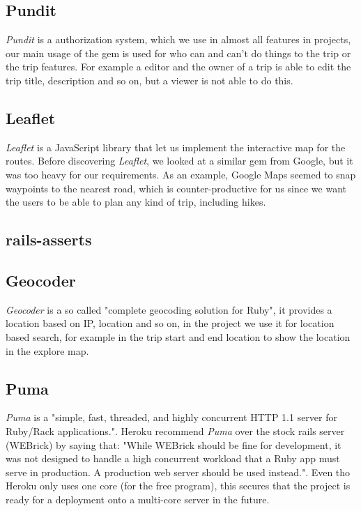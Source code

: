 \documentclass[a4paper]{article}
\begin{document}
\subsection{Pundit}
\textit{Pundit} is a authorization system\cite{pundit}, which we use in almost all features in projects, our main usage of the gem is used for who can and can't do things to the trip or the trip features. For example a editor and the owner of a trip is able to edit the trip title, description and so on, but a viewer is not able to do this. 

\subsection{Leaflet}
\textit{Leaflet}\cite{leaflet} is a JavaScript library that let us implement the interactive map for the routes. Before discovering \textit{Leaflet}, we looked at a similar gem from Google, but it was too heavy for our requirements. As an example, Google Maps seemed to snap waypoints to the nearest road, which is counter-productive for us since we want the users to be able to plan any kind of trip, including hikes.

\subsection{rails-asserts}

\subsection{Geocoder}
\textit{Geocoder} is a so called "complete geocoding solution for Ruby"\cite{geocoder}, it provides a location based on IP, location and so on, in the project we use it for location based search, for example in the trip start and end location to show the location in the explore map. 

\subsection{Puma}
\textit{Puma} is a "simple, fast, threaded, and highly concurrent HTTP 1.1 server for Ruby/Rack applications."\cite{puma}. Heroku recommend \textit{Puma} over the stock rails server (WEBrick) by saying that: "While WEBrick should be fine for development, it was not designed to handle a high concurrent workload that a Ruby app must serve in production. A production web server should be used instead."\cite{heroku_webserver}. Even tho Heroku only uses one core (for the free program), this secures that the project is ready for a deployment onto a multi-core server in the future.  
\end{document}

